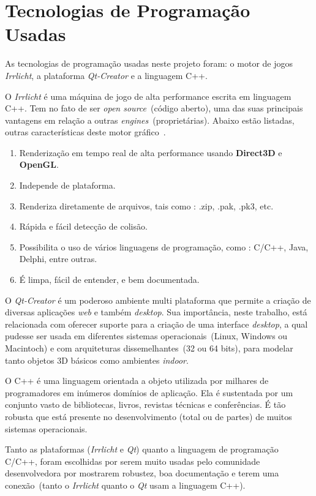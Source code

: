 \section{Tecnologias de Programação Usadas}
	As tecnologias de programação usadas neste projeto foram: o motor de jogos \textit{Irrlicht}, a plataforma \textit{Qt-Creator} e a linguagem C++. 

	O \textit{Irrlicht} é uma máquina de jogo de alta performance escrita em linguagem C++\cite{irrlichtbook}.  Tem no fato de ser \textit{open source}~(código aberto), uma das suas principais vantagens em relação a outras \textit{engines}~(proprietárias). Abaixo estão listadas, outras características deste motor gráfico~\cite{irrlicht}. 
\begin{enumerate}
\item Renderização em tempo real de alta performance usando \textbf{Direct3D} e \textbf{OpenGL}.
\item Independe de plataforma.
\item Renderiza diretamente de arquivos, tais como : .zip, .pak, .pk3, etc.
\item Rápida e fácil detecção de colisão.
\item Possibilita o uso de vários linguagens de programação, como : C/C++, Java, Delphi, entre outras.
\item É limpa, fácil de entender, e bem documentada.
\end{enumerate}

	 O \textit{Qt-Creator} é um poderoso ambiente multi plataforma que permite a criação de diversas aplicações \textit{web} e também \textit{desktop}. Sua importância, neste trabalho, está relacionada com oferecer suporte para a criação de uma interface \textit{desktop}, a qual pudesse ser usada em diferentes sistemas operacionais~(Linux, Windows ou Macintoch) e com arquiteturas dissemelhantes~(32 ou 64 bits), para modelar tanto objetos 3D básicos como ambientes \textit{indoor}. 

	O C++ é uma linguagem orientada a objeto utilizada por milhares de programadores em inúmeros domínios de aplicação. Ela é sustentada por um conjunto vasto de bibliotecas, livros, revistas técnicas e conferências. É tão robusta que está presente no desenvolvimento (total ou de partes) de muitos sistemas operacionais. 

	Tanto as plataformas (\textit{Irrlicht} e \textit{Qt}) quanto a linguagem de programação C/C++, foram escolhidas por serem muito usadas pelo comunidade desenvolvedora por mostrarem robustez,  boa documentação e  terem uma conexão~(tanto o \textit{Irrlicht} quanto o \textit{Qt} usam a linguagem C++).

